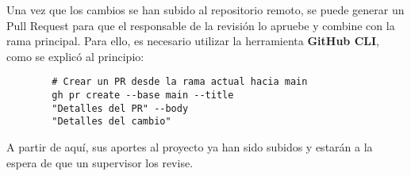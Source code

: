 \documentclass[a4paper]{article}
\begin{document}
\newpage
\thispagestyle{fancy}
Una vez que los cambios se han subido al repositorio remoto, se puede generar un Pull Request para que el responsable de la revisión lo apruebe y combine con la rama principal. Para ello, es necesario utilizar la herramienta \textbf{GitHub CLI}, como se explicó al principio:

    \begin{lstlisting}
        # Crear un PR desde la rama actual hacia main
        gh pr create --base main --title
        "Detalles del PR" --body
        "Detalles del cambio"
    \end{lstlisting}

A partir de aquí, sus aportes al proyecto ya han sido subidos y estarán a la espera de que un supervisor los revise.
\end{document}
